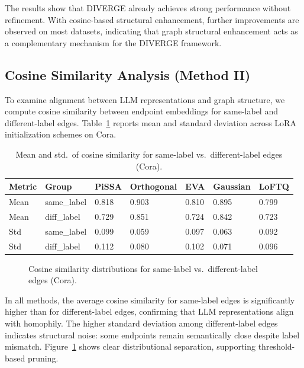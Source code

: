 The results show that DIVERGE already achieves strong performance without refinement.
With cosine-based structural enhancement, further improvements are observed on most
datasets, indicating that graph structural enhancement acts as a complementary mechanism
for the DIVERGE framework.


\subsection{Cosine Similarity Analysis (Method II)}
To examine alignment between LLM representations and graph structure, we compute cosine
similarity between endpoint embeddings for same-label and different-label edges.
Table~\ref{tab:mean_std_cos_similarity} reports mean and standard deviation across LoRA
initialization schemes on Cora.

\begin{table}[htbp]
\centering
\caption{Mean and std.\ of cosine similarity for same-label vs.\ different-label edges (Cora).}
\label{tab:mean_std_cos_similarity}
\small
\begin{tabularx}{\textwidth}{l l *{5}{X}}
\toprule
Metric & Group & PiSSA & Orthogonal & EVA & Gaussian & LoFTQ \\
\midrule
Mean & same\_label & 0.818 & 0.903 & 0.810 & 0.895 & 0.799 \\
Mean & diff\_label & 0.729 & 0.851 & 0.724 & 0.842 & 0.723 \\
Std & same\_label & 0.099 & 0.059 & 0.097 & 0.063 & 0.092 \\
Std & diff\_label & 0.112 & 0.080 & 0.102 & 0.071 & 0.096 \\
\bottomrule
\end{tabularx}
\end{table}

\begin{figure}[htbp]
\centering
{}
\caption{Cosine similarity distributions for same-label vs.\ different-label edges (Cora).}
\label{fig:cosine_box_plot}
\end{figure}

In all methods, the average cosine similarity for same-label edges is significantly
higher than for different-label edges, confirming that LLM representations align with
homophily. The higher standard deviation among different-label edges indicates structural
noise: some endpoints remain semantically close despite label mismatch. Figure~\ref{fig:cosine_box_plot}
shows clear distributional separation, supporting threshold-based pruning.

